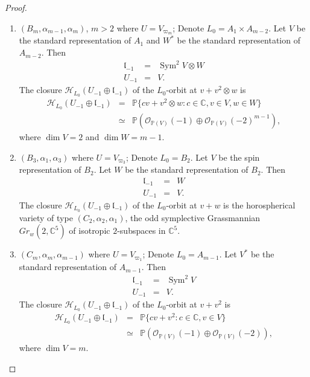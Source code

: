 \documentclass[12pt]{amsart}
\theoremstyle{plain}
\theoremstyle{definition}
\def\Sym{\operatorname{Sym}}
\begin{document}
\begin{proof}
\begin{enumerate}
\item[(1)] $(B_m, \alpha_{m-1}, \alpha_{m})$, $m>2$ where $U=V_{\varpi_m}$; Denote $L_0=A_1\times A_{m-2}$. Let $V$ be the standard representation of $A_1$ and $W^*$ be the standard representation of $A_{m-2}$. Then
\begin{eqnarray*}
\mathfrak l_{-1}&=& \Sym^2 V \otimes W \\
U_{-1}&=& V.
\end{eqnarray*}
The closure  $\mathcal H_{L_0}( U_{-1}\oplus \mathfrak l_{-1})$ of the $L_0$-orbit at $v + v^2\otimes w$ is
\begin{eqnarray*}
 \mathcal H_{L_0}( U_{-1}\oplus \mathfrak l_{-1})&=&\mathbb P \{c v + v^2 \otimes w: c \in \mathbb C, v \in V, w \in W\} \\
 &\simeq& \mathbb P (\mathcal O_{\mathbb P(V)}(-1) \oplus \mathcal O_{\mathbb P(V)}(-2)^{m-1}),
\end{eqnarray*}
where $\dim V=2$ and $ \dim W=m-1$.

\item[(2)]$(B_3, \alpha_{1}, \alpha_{3})$ where $U=V_{\varpi_3}$; Denote $L_0=B_2$. Let $V$ be the spin representation of $B_2$. Let $W$ be the standard representation of $B_2$. Then
\begin{eqnarray*}
\mathfrak l_{-1}&=& W\\
U_{-1}&=& V.
\end{eqnarray*}
The closure $\mathcal H_{L_0}( U_{-1}\oplus \mathfrak l_{-1})$ of the $L_0$-orbit at $v+w$ is the horospherical variety of type $(C_2, \alpha_2, \alpha_1)$, the odd symplective Grassmannian $Gr_w(2,\mathbb C^5)$ of isotropic $2$-subspaces in $\mathbb C^5$.

\item[${\rm (3)_{m}}$] $(C_m, \alpha_{m}, \alpha_{m-1})$ where $U=V_{\varpi_1}$; Denote $L_0=A_{m-1}$. Let $V^*$ be the standard representation of $A_{m-1}$. %
Then
\begin{eqnarray*}
\mathfrak l_{-1}&=& \Sym^2V \\
U_{-1}&=& V.
\end{eqnarray*}
The closure  $\mathcal H_{L_0}( U_{-1}\oplus \mathfrak l_{-1})$ of the $L_0$-orbit at $v+ v^2$ is
 \begin{eqnarray*}
\mathcal H_{L_0}( U_{-1}\oplus \mathfrak l_{-1})&=& \mathbb P \{c v + v^2 : c \in \mathbb C, v \in V\} \\
&\simeq& \mathbb P (\mathcal O_{\mathbb P(V)}(-1) \oplus \mathcal O_{\mathbb P(V)}(-2)),
\end{eqnarray*}
where $\dim V=m$.


\end{enumerate}
\end{proof}
\end{document}
